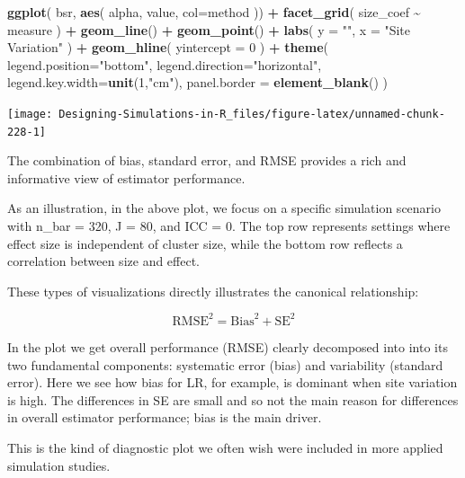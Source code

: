 \documentclass[
]{book}
\newenvironment{Shaded}{\begin{snugshade}}{\end{snugshade}}
\newcommand{\AttributeTok}[1]{\textcolor[rgb]{0.13,0.29,0.53}{#1}}
\newcommand{\DecValTok}[1]{\textcolor[rgb]{0.00,0.00,0.81}{#1}}
\newcommand{\FunctionTok}[1]{\textcolor[rgb]{0.13,0.29,0.53}{\textbf{#1}}}
\newcommand{\NormalTok}[1]{#1}
\newcommand{\SpecialCharTok}[1]{\textcolor[rgb]{0.81,0.36,0.00}{\textbf{#1}}}
\newcommand{\StringTok}[1]{\textcolor[rgb]{0.31,0.60,0.02}{#1}}
\begin{document}
\begin{Shaded}
\begin{Highlighting}[]
\FunctionTok{ggplot}\NormalTok{( bsr, }\FunctionTok{aes}\NormalTok{( alpha, value, }\AttributeTok{col=}\NormalTok{method )) }\SpecialCharTok{+}
  \FunctionTok{facet\_grid}\NormalTok{( size\_coef }\SpecialCharTok{\textasciitilde{}}\NormalTok{ measure ) }\SpecialCharTok{+}
  \FunctionTok{geom\_line}\NormalTok{() }\SpecialCharTok{+} \FunctionTok{geom\_point}\NormalTok{() }\SpecialCharTok{+}
  \FunctionTok{labs}\NormalTok{( }\AttributeTok{y =} \StringTok{""}\NormalTok{, }\AttributeTok{x =} \StringTok{"Site Variation"}\NormalTok{ )  }\SpecialCharTok{+}
  \FunctionTok{geom\_hline}\NormalTok{( }\AttributeTok{yintercept =} \DecValTok{0}\NormalTok{ ) }\SpecialCharTok{+}
  \FunctionTok{theme}\NormalTok{( }\AttributeTok{legend.position=}\StringTok{"bottom"}\NormalTok{,}
         \AttributeTok{legend.direction=}\StringTok{"horizontal"}\NormalTok{, }
         \AttributeTok{legend.key.width=}\FunctionTok{unit}\NormalTok{(}\DecValTok{1}\NormalTok{,}\StringTok{"cm"}\NormalTok{),}
         \AttributeTok{panel.border =} \FunctionTok{element\_blank}\NormalTok{() )}
\end{Highlighting}
\end{Shaded}

\begin{center}\texttt{[image: Designing-Simulations-in-R\_files/figure-latex/unnamed-chunk-228-1]} \end{center}

The combination of bias, standard error, and RMSE provides a rich and informative view of estimator performance.

As an illustration, in the above plot, we focus on a specific simulation scenario with n\_bar = 320, J = 80, and ICC = 0. The top row represents settings where effect size is independent of cluster size, while the bottom row reflects a correlation between size and effect.

These types of visualizations directly illustrates the canonical relationship:

\[ \text{RMSE}^2 = \text{Bias}^2 + \text{SE}^2 \]

In the plot we get overall performance (RMSE) clearly decomposed into into its two fundamental components: systematic error (bias) and variability (standard error).
Here we see how bias for LR, for example, is dominant when site variation is high.
The differences in SE are small and so not the main reason for differences in overall estimator performance; bias is the main driver.

This is the kind of diagnostic plot we often wish were included in more applied simulation studies.
\end{document}

